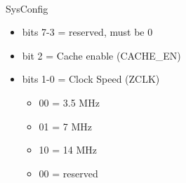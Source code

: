 \\
SysConfig
\begin{itemize}
\item bits 7-3 = reserved, must be 0
\item bit 2 = Cache enable (CACHE\_EN)
\item bits 1-0 = Clock Speed (ZCLK)
  \begin{itemize}
  \item 00 = 3.5 MHz
  \item 01 = 7 MHz
  \item 10 = 14 MHz
  \item 00 = reserved
  \end{itemize}
\end{itemize}

